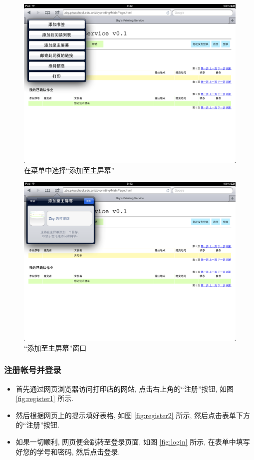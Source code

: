 \documentclass{article}
\begin{document}
\begin{CJK}{UTF8}{gbsn}
				\begin{figure}[hp]
					\centering
					\includegraphics[height=0.45\textheight]{install_ipad1.png}
					\caption{在菜单中选择``添加至主屏幕''}
					\label{fig:install_ipad1}
				\end{figure}
				\begin{figure}[hp]
					\centering
					\includegraphics[height=0.45\textheight]{install_ipad2.png}
					\caption{``添加至主屏幕''窗口}
					\label{fig:install_ipad2}
				\end{figure}
				\clearpage
		
		\newpage
		\subsubsection{注册帐号并登录}
			\begin{itemize}
				\item{首先通过网页浏览器访问打印店的网站, 点击右上角的``注册''按钮, 如图 \ref{fig:register1} 所示.}
				\item{然后根据网页上的提示填好表格, 如图 \ref{fig:register2} 所示, 然后点击表单下方的``注册''按钮.}
				\item{如果一切顺利, 网页便会跳转至登录页面, 如图 \ref{fig:login} 所示, 在表单中填写好您的学号和密码, 然后点击登录.}
			\end{itemize}
			

\end{CJK}
\end{document}
